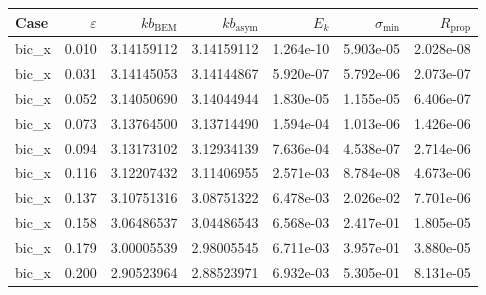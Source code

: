 \begin{tabular}{lrrrrrr}
\hline
Case & $\varepsilon$ & $kb_{\mathrm{BEM}}$ & $kb_{\mathrm{asym}}$ & $E_k$ & $\sigma_{\min}$ & $R_{\mathrm{prop}}$ \\
\hline
bic_x & 0.010 & 3.14159112 & 3.14159112 & 1.264e-10 & 5.903e-05 & 2.028e-08 \\
bic_x & 0.031 & 3.14145053 & 3.14144867 & 5.920e-07 & 5.792e-06 & 2.073e-07 \\
bic_x & 0.052 & 3.14050690 & 3.14044944 & 1.830e-05 & 1.155e-05 & 6.406e-07 \\
bic_x & 0.073 & 3.13764500 & 3.13714490 & 1.594e-04 & 1.013e-06 & 1.426e-06 \\
bic_x & 0.094 & 3.13173102 & 3.12934139 & 7.636e-04 & 4.538e-07 & 2.714e-06 \\
bic_x & 0.116 & 3.12207432 & 3.11406955 & 2.571e-03 & 8.784e-08 & 4.673e-06 \\
bic_x & 0.137 & 3.10751316 & 3.08751322 & 6.478e-03 & 2.026e-02 & 7.701e-06 \\
bic_x & 0.158 & 3.06486537 & 3.04486543 & 6.568e-03 & 2.417e-01 & 1.805e-05 \\
bic_x & 0.179 & 3.00005539 & 2.98005545 & 6.711e-03 & 3.957e-01 & 3.880e-05 \\
bic_x & 0.200 & 2.90523964 & 2.88523971 & 6.932e-03 & 5.305e-01 & 8.131e-05 \\
\hline
\end{tabular}
